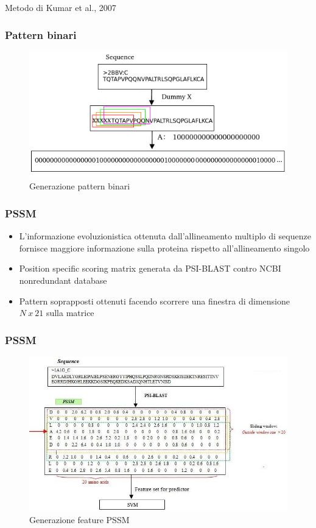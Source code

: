 \documentclass{beamer}
\begin{document}
\begin{section}{Metodo di Kumar et al., 2007}
\begin{frame}
\frametitle{Pattern binari}
\begin{figure}
\centering
\includegraphics[width=0.7\linewidth]{./img/binary_pattern}
\caption{Generazione pattern binari}
\label{fig:binary_pattern}
\end{figure}
\end{frame}

\begin{frame}
\frametitle{PSSM}
\begin{itemize}
\item L'informazione evoluzionistica ottenuta dall'allineamento multiplo di sequenze fornisce maggiore informazione sulla proteina rispetto all'allineamento singolo
\item Position specific scoring matrix generata da PSI-BLAST contro NCBI nonredundant database
\item Pattern soprapposti ottenuti facendo scorrere una finestra di dimensione $N\ x\ 21 $ sulla matrice
\end{itemize}
\end{frame}

\begin{frame}
\frametitle{PSSM}
\begin{figure}
\centering
\includegraphics[width=0.7\linewidth]{./img/pssm_pattern}
\caption[]{Generazione feature PSSM}
\label{fig:pssm_pattern}
\end{figure}
\end{frame}


\end{section}
\end{document}

